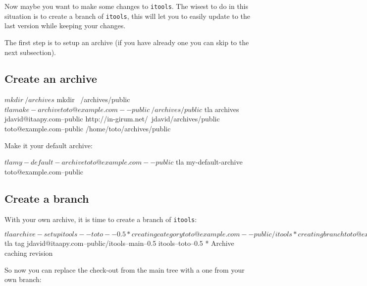 Now maybe you want to make some changes to {\tt itools}. The wisest to do
in this situation is to create a branch of {\tt itools}, this will let you
to easily update to the last version while keeping your changes.

The first step is to setup an archive (if you have already one you can
skip to the next subsection).

\subsection{Create an archive}

\begin{code}
    $ mkdir ~/{archives}
    $ mkdir ~/{archives}/public
    $ tla make-archive toto@example.com--public ~/{archives}/public
    $ tla archives
    jdavid@itaapy.com--public
        http://in-girum.net/~jdavid/archives/public
    toto@example.com--public
        /home/toto/{archives}/public
\end{code}

Make it your default archive:

\begin{code}
    $ tla my-default-archive toto@example.com--public
    $ tla my-default-archive
    toto@example.com--public
\end{code}

\subsection{Create a branch}

With your own archive, it is time to create a branch of {\tt itools}:

\begin{code}
    $ tla archive-setup itools--toto--0.5
      * creating category toto@example.com--public/itools
      * creating branch toto@example.com--public/itools--toto
      * creating version toto@example.com--public/itools--toto--0.5
    $ tla tag jdavid@itaapy.com--public/itools--main--0.5 itools--toto--0.5
      * Archive caching revision
\end{code}

So now you can replace the check-out from the main tree with a one from
your own branch:



